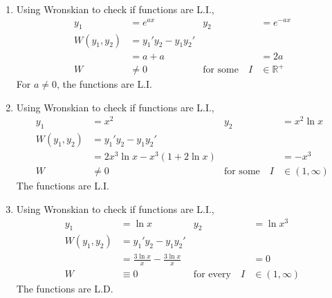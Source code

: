 \begin{enumerate}
    \item Using Wronskian to check if functions are L.I.,
          \begin{align}
              y_{1}           & = e^{ax}                    & y_{2}                   & = e^{-ax}          \\
              W(y_{1}, y_{2}) & = y_{1}'y_{2} - y_{1}y_{2}'                                                \\
                              & = a + a                     &                         & = 2a               \\
              W               & \neq 0                      & \text{for some} \quad I & \in \mathbb{R}^{+}
          \end{align}
          For $ a \neq 0 $, the functions are L.I.

    \item Using Wronskian to check if functions are L.I.,
          \begin{align}
              y_{1}           & = x^{2}                           & y_{2}                   & = x^{2}\ln x    \\
              W(y_{1}, y_{2}) & = y_{1}'y_{2} - y_{1}y_{2}'                                                   \\
                              & = 2x^{3}\ln x - x^{3}(1 + 2\ln x) &                         & = -x^{3}        \\
              W               & \neq 0                            & \text{for some} \quad I & \in (1, \infty)
          \end{align}
          The functions are L.I.

    \item Using Wronskian to check if functions are L.I.,
          \begin{align}
              y_{1}           & = \ln x                               & y_{2}                    & = \ln x^{3}     \\
              W(y_{1}, y_{2}) & = y_{1}'y_{2} - y_{1}y_{2}'                                                        \\
                              & = \frac{3\ln x}{x} - \frac{3\ln x}{x} &                          & = 0             \\
              W               & \equiv 0                              & \text{for every} \quad I & \in (1, \infty)
          \end{align}
          The functions are L.D.


\end{enumerate}

